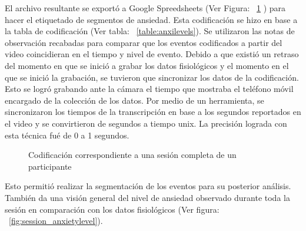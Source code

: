 El archivo resultante se export\'o a Google Spreedsheets (Ver Figura: ~\ref{fig:img_codification} ) para hacer el etiquetado de segmentos de ansiedad. Esta codificaci\'on se hizo en base a la tabla de codificaci\'on (Ver tabla: ~\ref{table:anxilevels}). Se utilizaron las notas de observaci\'on recabadas para comparar que los eventos codificados a partir del video coincidieran en el tiempo y nivel de evento. Debido a que existi\'o un retraso del momento en que se inici\'o a grabar los datos fisiol\'ogicos y el momento en el que se inici\'o la grabaci\'on, se tuvieron que sincronizar los datos de la codificaci\'on. Esto se logr\'o grabando ante la c\'amara el tiempo que mostraba el tel\'efono m\'ovil encargado de la colecci\'on de los datos. Por medio de un herramienta, se sincronizaron los tiempos de la transcripci\'on en base a los segundos reportados en el video y se convirtieron de segundos a tiempo unix. La precisi\'on lograda con esta t\'ecnica fu\'e de 0 a 1 segundos.


\begin{figure}[h]
        \centering
        \caption{Codificaci\'on correspondiente a una sesi\'on completa de un participante}\label{fig:img_codification}
\end{figure}

Esto permiti\'o realizar la segmentaci\'on de los eventos para su posterior an\'alisis. Tambi\'en da una visi\'on general del nivel de ansiedad observado durante toda la sesi\'on en comparaci\'on con los datos fisiol\'ogicos (Ver figura: ~\ref{fig:session_anxietylevel}).

